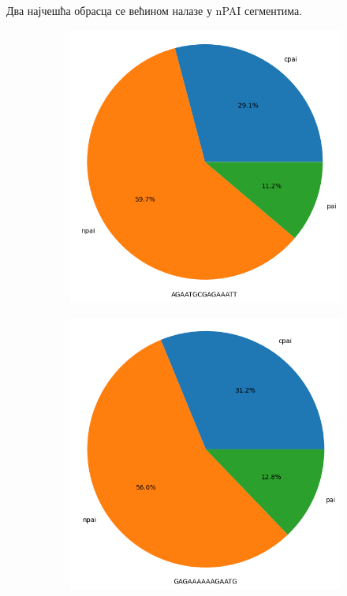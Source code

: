 \documentclass[12pt]{article}
\begin{document}
Два најчешћа обрасца се већином налазе у nPAI сегментима.

\begin{figure}[htbp]
    \vspace{0.2cm}
    \centering
    \begin{subfigure}{0.41\linewidth}
        \centering
        \includegraphics[width=\linewidth]{images/h_pylori/first_by_islands.png}
    \end{subfigure}
    \begin{subfigure}{0.41\linewidth}
        \centering
        \includegraphics[width=\linewidth]{images/h_pylori/second_by_islands.png}

\end{subfigure}
\end{figure}
\end{document}
